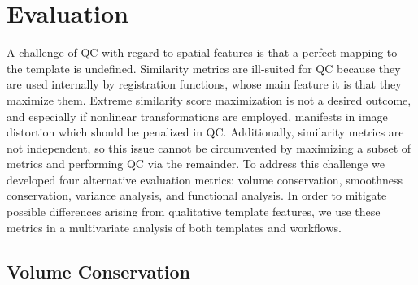 \section{Evaluation}

A challenge of QC with regard to spatial features is that a perfect mapping to the template is undefined.
Similarity metrics are ill-suited for QC because they are used internally by registration functions, whose main feature it is that they maximize them.
Extreme similarity score maximization is not a desired outcome, and especially if nonlinear transformations are employed, manifests in image distortion which should be penalized in QC.
Additionally, similarity metrics are not independent, so this issue cannot be circumvented by maximizing a subset of metrics and performing QC via the remainder.
To address this challenge we developed four alternative evaluation metrics: volume conservation, smoothness conservation, variance analysis, and functional analysis.
In order to mitigate possible differences arising from qualitative template features, we use these metrics in a multivariate analysis of both templates and workflows.


\subsection{Volume Conservation}

\begin{sansmath}
\end{sansmath}

